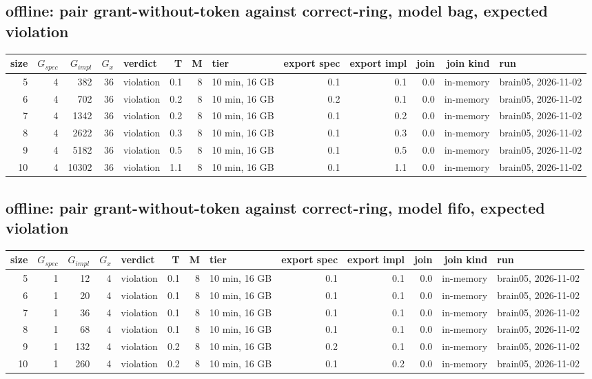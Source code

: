\documentclass[10pt]{article}
\begin{document}
\subsection*{offline: pair \textsf{grant-without-token} against \textsf{correct-ring}, model bag, expected violation}
\begin{longtable}{@{}rrrrlrrlrrrrl@{}}
\toprule
size & $G_{\mathit{spec}}$ & $G_{\mathit{impl}}$ & $G_x$ & verdict & T & M & tier & export spec & export impl & join & join kind & run \\
\midrule
\endhead
\color{red} 5 & 4 & 382 & 36 & violation & 0.1 & 8 & 10 min, 16 GB & 0.1 & 0.1 & 0.0 & in-memory & brain05, 2026-11-02 \\
\color{red} 6 & 4 & 702 & 36 & violation & 0.2 & 8 & 10 min, 16 GB & 0.2 & 0.1 & 0.0 & in-memory & brain05, 2026-11-02 \\
\color{red} 7 & 4 & 1342 & 36 & violation & 0.2 & 8 & 10 min, 16 GB & 0.1 & 0.2 & 0.0 & in-memory & brain05, 2026-11-02 \\
\color{red} 8 & 4 & 2622 & 36 & violation & 0.3 & 8 & 10 min, 16 GB & 0.1 & 0.3 & 0.0 & in-memory & brain05, 2026-11-02 \\
\color{red} 9 & 4 & 5182 & 36 & violation & 0.5 & 8 & 10 min, 16 GB & 0.1 & 0.5 & 0.0 & in-memory & brain05, 2026-11-02 \\
\color{red} 10 & 4 & 10302 & 36 & violation & 1.1 & 8 & 10 min, 16 GB & 0.1 & 1.1 & 0.0 & in-memory & brain05, 2026-11-02 \\
\bottomrule
\end{longtable}
\subsection*{offline: pair \textsf{grant-without-token} against \textsf{correct-ring}, model fifo, expected violation}
\begin{longtable}{@{}rrrrlrrlrrrrl@{}}
\toprule
size & $G_{\mathit{spec}}$ & $G_{\mathit{impl}}$ & $G_x$ & verdict & T & M & tier & export spec & export impl & join & join kind & run \\
\midrule
\endhead
\color{red} 5 & 1 & 12 & 4 & violation & 0.1 & 8 & 10 min, 16 GB & 0.1 & 0.1 & 0.0 & in-memory & brain05, 2026-11-02 \\
\color{red} 6 & 1 & 20 & 4 & violation & 0.1 & 8 & 10 min, 16 GB & 0.1 & 0.1 & 0.0 & in-memory & brain05, 2026-11-02 \\
\color{red} 7 & 1 & 36 & 4 & violation & 0.1 & 8 & 10 min, 16 GB & 0.1 & 0.1 & 0.0 & in-memory & brain05, 2026-11-02 \\
\color{red} 8 & 1 & 68 & 4 & violation & 0.1 & 8 & 10 min, 16 GB & 0.1 & 0.1 & 0.0 & in-memory & brain05, 2026-11-02 \\
\color{red} 9 & 1 & 132 & 4 & violation & 0.2 & 8 & 10 min, 16 GB & 0.2 & 0.1 & 0.0 & in-memory & brain05, 2026-11-02 \\
\color{red} 10 & 1 & 260 & 4 & violation & 0.2 & 8 & 10 min, 16 GB & 0.1 & 0.2 & 0.0 & in-memory & brain05, 2026-11-02 \\
\bottomrule
\end{longtable}
\end{document}

